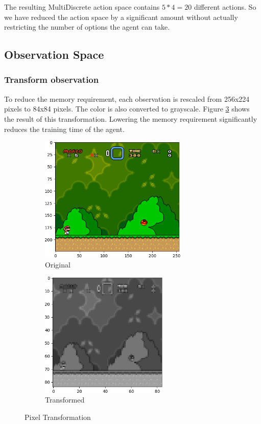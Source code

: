 \documentclass{article}
\begin{document}
The resulting MultiDiscrete action space contains $5*4 = 20$ different actions.
So we have reduced the action space by a significant amount without actually restricting the number of options the agent can take.

\subsection{Observation Space}
\subsubsection{Transform observation}
To reduce the memory requirement, each observation is rescaled from 256x224 pixels to 84x84 pixels.
The color is also converted to grayscale.
Figure \ref{fig:transformation} shows the result of this transformation.
Lowering the memory requirement significantly reduces the training time of the agent.
\begin{figure}[ht]
    \centering
    \begin{subfigure}{.5\textwidth}
        \centering
        \includegraphics[height=6cm]{original_crop}
        \caption{Original}
        \label{fig:sub1}
    \end{subfigure}%
    \begin{subfigure}{.5\textwidth}
        \centering
        \includegraphics[height=6cm]{grayscale_crop}
        \caption{Transformed}
        \label{fig:sub2}
    \end{subfigure}
    \caption{Pixel Transformation}
    \label{fig:transformation}
\end{figure}
\end{document}

